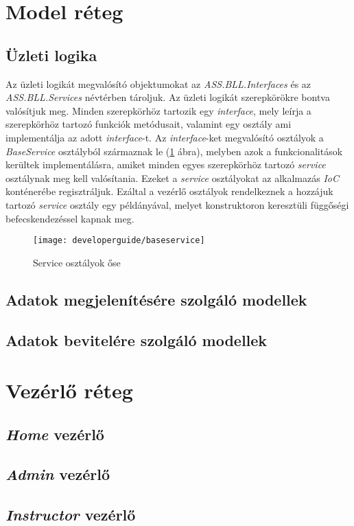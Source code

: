 \section{Model réteg}
\label{sec:model}
\subsection{Üzleti logika}
Az üzleti logikát megvalósító objektumokat az \emph{ASS.BLL.Interfaces} és az \emph{ASS.BLL.Services} névtérben tároljuk. Az üzleti logikát szerepkörökre bontva valósítjuk meg. Minden szerepkörhöz tartozik egy \emph{interface}, mely leírja a szerepkörhöz tartozó funkciók metódusait, valamint egy osztály ami implementálja az adott \emph{interface}-t. Az \emph{interface}-ket megvalósító osztályok a \emph{BaseService} osztályból származnak le (\ref{fig:bll-baseservice} ábra), melyben azok a funkcionalitások kerültek implementálásra, amiket minden egyes szerepkörhöz tartozó \emph{service} osztálynak meg kell valósítania. Ezeket a \emph{service} osztályokat az alkalmazás \emph{IoC} konténerébe \cite{IoC} regisztráljuk. Ezáltal a vezérlő osztályok rendelkeznek a hozzájuk tartozó \emph{service} osztály egy példányával, melyet konstruktoron keresztüli függőségi befecskendezéssel kapnak meg.
\begin{figure}[H]
	\centering
	\texttt{[image: developerguide/baseservice]}
	\caption{Service osztályok őse}
	\label{fig:bll-baseservice}
\end{figure}
\subsection{Adatok megjelenítésére szolgáló modellek}
\subsection{Adatok bevitelére szolgáló modellek}
\section{Vezérlő réteg}
\label{sec:controller}
\subsection{\emph{Home} vezérlő}
\subsection{\emph{Admin} vezérlő}
\subsection{\emph{Instructor} vezérlő}
